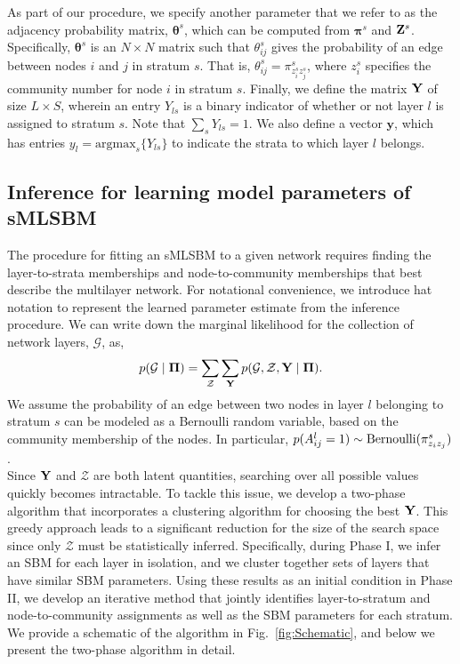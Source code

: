   \indent As part of our procedure, we specify another parameter that we refer to as the adjacency probability matrix, ${\boldsymbol \theta}^{s}$, which can be computed from $\boldsymbol{\pi}^{s}$ and ${\bf{Z}}^{s}$. Specifically, ${\boldsymbol \theta}^{s}$ is an $N \times N$ matrix such that ${\theta}_{ij}^{s}$ gives the probability of an edge between nodes $i$ and $j$ in stratum $s$. That is, ${\theta}_{ij}^{s}={ \pi}^{s}_{z_{i}^{s}z_{j}^{s}}$, where  $z_{i}^{s}$ specifies the community number for node $i$ in stratum $s$. Finally, we define the matrix ${\bf Y}$ of size $L\times S$, wherein an entry $Y_{ls}$ is a binary indicator of whether or not layer $l$ is assigned to stratum $s$. Note that $\sum_{s}Y_{ls}=1$. We also define a vector $\boldsymbol y$, which has entries $y_{l}=\text{argmax}_s \{Y_{ls}\}$ to indicate the strata to which layer $l$ belongs.

\subsection{Inference for learning model parameters of sMLSBM}
\indent The procedure for fitting an sMLSBM to a given network requires finding the layer-to-strata memberships and node-to-community memberships that best describe the multilayer network. For notational convenience, we introduce hat notation to represent the learned parameter estimate from the inference procedure. We can write down the marginal likelihood for the collection of network layers, $\mathcal{G}$, as,
\begin{equation}
\label{eq1}
p(\mathcal{G}\mid {\boldsymbol \Pi})=\sum_{\mathcal Z}\sum_{{\bf Y}}p(\mathcal{G},{\mathcal Z},{\bf Y} \mid {\boldsymbol \Pi}).
\end{equation}
We assume the probability of an edge between two nodes in layer $l$ belonging to stratum $s$ can be modeled as a Bernoulli random variable, based on the community membership of the nodes. In particular, $p({A}^{l}_{ij}=1)\sim \text{Bernoulli}({\bf \pi}_{z_{i}z_{j}}^{s})$. \\
\indent Since ${\bf Y}$ and ${\mathcal Z}$ are both latent quantities, searching over all possible values quickly becomes intractable. To tackle this issue, we develop a two-phase algorithm that incorporates a clustering algorithm for choosing the best $\bf Y$. This greedy approach leads to a significant reduction for the size of the search space since only $\mathcal Z$ must be statistically inferred. Specifically, during Phase I, we infer an SBM for each layer in isolation, and we cluster together sets of layers that have similar SBM parameters. Using these results as an initial condition in Phase II, we develop an iterative method that jointly identifies layer-to-stratum and node-to-community assignments as well as the SBM parameters for each stratum. We provide a schematic of the algorithm in Fig.~\ref{fig:Schematic}, and below we present the two-phase algorithm in detail.

